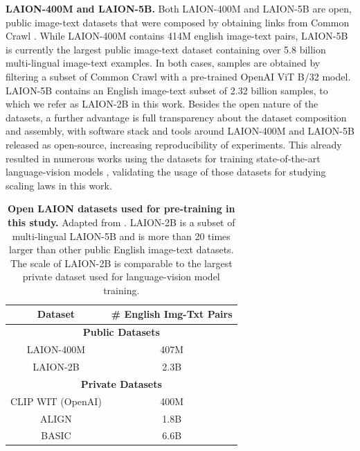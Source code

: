 \begin{appendix}
\textbf{LAION-400M and LAION-5B.} Both LAION-400M \citep{schuhmann2021laion} and LAION-5B \citep{Schuhmann2022} are open, public image-text datasets that were composed by obtaining links from Common Crawl \citep{common_crawl}. While LAION-400M contains 414M english image-text pairs, LAION-5B is currently the largest public image-text dataset containing over 5.8 billion multi-lingual image-text examples. In both cases, samples are obtained by filtering a subset of Common Crawl with a pre-trained OpenAI ViT B/32 model. LAION-5B contains an English image-text subset of 2.32 billion samples, to which we refer as LAION-2B in this work. Besides the open nature of the datasets, a further advantage is full transparency about the dataset composition and assembly, with software stack and tools around LAION-400M and LAION-5B released as open-source, increasing reproducibility of experiments. This already resulted in numerous works using the datasets for training state-of-the-art language-vision models \citep{rombach2021highresolution, mustafa2022multimodal, ho2022imagen, wang2022internimage, fang2022eva}, %
validating the usage of those datasets for studying scaling laws in this work.

\begin{table}
\centering
        \begin{footnotesize}
        \begin{tabular}{cc}\hline
        \textbf{Dataset}  & \textbf{\# English Img-Txt Pairs} \\
        \hline
        \multicolumn{2}{c}{\textbf{Public Datasets}}         \\ \hline
        {LAION-400M} & 407M \\
        {LAION-2B} & 2.3B                    \\ \hline
        \multicolumn{2}{c}{\textbf{Private Datasets}}         \\ \hline
        CLIP WIT (OpenAI) & 400M                    \\
        ALIGN    & 1.8B                    \\
        BASIC    & 6.6B                      \\ \hline
        \end{tabular}
        \end{footnotesize}

  \caption{\textbf{Open LAION datasets used for pre-training in this study.} Adapted from \citep{Schuhmann2022}. LAION-2B is a subset of multi-lingual LAION-5B and is more than 20 times larger than other public English image-text datasets. The scale of LAION-2B is comparable to the largest private dataset used for language-vision model training.}%
  \label{fig:laion_datasets}
\end{table}


\end{appendix}
